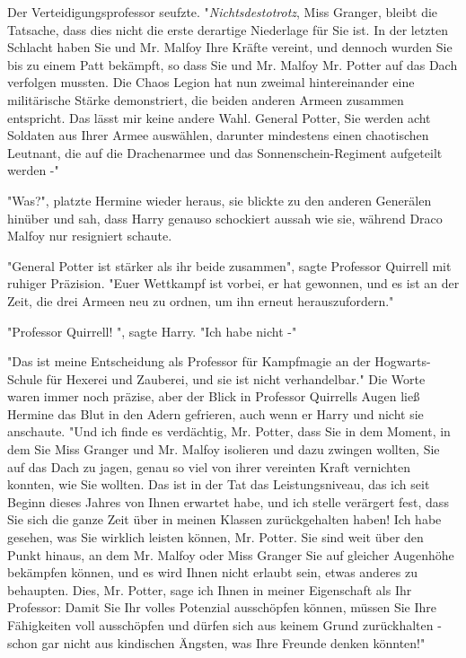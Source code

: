 {Der Verteidigungsprofessor seufzte. "\emph{Nichtsdestotrotz}, Miss Granger, bleibt die Tatsache, dass dies nicht die erste derartige Niederlage für Sie ist. In der letzten Schlacht haben Sie und Mr. Malfoy Ihre Kräfte vereint, und dennoch wurden Sie bis zu einem Patt bekämpft, so dass Sie und Mr. Malfoy Mr. Potter auf das Dach verfolgen mussten. Die Chaos Legion hat nun zweimal hintereinander eine militärische Stärke demonstriert, die beiden anderen Armeen zusammen entspricht. Das lässt mir keine andere Wahl. General Potter, Sie werden acht Soldaten aus Ihrer Armee auswählen, darunter mindestens einen chaotischen Leutnant, die auf die Drachenarmee und das Sonnenschein-Regiment aufgeteilt werden -"

"Was?", platzte Hermine wieder heraus, sie blickte zu den anderen Generälen hinüber und sah, dass Harry genauso schockiert aussah wie sie, während Draco Malfoy nur resigniert schaute.

"General Potter ist stärker als ihr beide zusammen", sagte Professor Quirrell mit ruhiger Präzision. "Euer Wettkampf ist vorbei, er hat gewonnen, und es ist an der Zeit, die drei Armeen neu zu ordnen, um ihn erneut herauszufordern."

"Professor Quirrell! ", sagte Harry. "Ich habe nicht -"

"Das ist meine Entscheidung als Professor für Kampfmagie an der Hogwarts-Schule für Hexerei und Zauberei, und sie ist nicht verhandelbar." Die Worte waren immer noch präzise, aber der Blick in Professor Quirrells Augen ließ Hermine das Blut in den Adern gefrieren, auch wenn er Harry und nicht sie anschaute. "Und ich finde es verdächtig, Mr. Potter, dass Sie in dem Moment, in dem Sie Miss Granger und Mr. Malfoy isolieren und dazu zwingen wollten, Sie auf das Dach zu jagen, genau so viel von ihrer vereinten Kraft vernichten konnten, wie Sie wollten. Das ist in der Tat das Leistungsniveau, das ich seit Beginn dieses Jahres von Ihnen erwartet habe, und ich stelle verärgert fest, dass Sie sich die ganze Zeit über in meinen Klassen zurückgehalten haben! Ich habe gesehen, was Sie wirklich leisten können, Mr. Potter. Sie sind weit über den Punkt hinaus, an dem Mr. Malfoy oder Miss Granger Sie auf gleicher Augenhöhe bekämpfen können, und es wird Ihnen nicht erlaubt sein, etwas anderes zu behaupten. Dies, Mr. Potter, sage ich Ihnen in meiner Eigenschaft als Ihr Professor: Damit Sie Ihr volles Potenzial ausschöpfen können, müssen Sie Ihre Fähigkeiten voll ausschöpfen und dürfen sich aus keinem Grund zurückhalten - schon gar nicht aus kindischen Ängsten, was Ihre Freunde denken könnten!"

}
